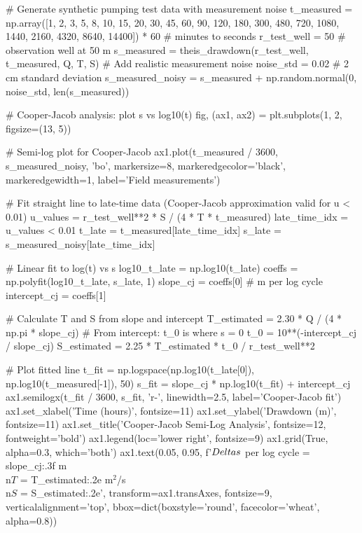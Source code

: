 \documentclass[a4paper, 11pt]{article}
\begin{document}
\begin{pycode}
# Generate synthetic pumping test data with measurement noise
t_measured = np.array([1, 2, 3, 5, 8, 10, 15, 20, 30, 45, 60, 90, 120, 180,
                       300, 480, 720, 1080, 1440, 2160, 4320, 8640, 14400]) * 60  # minutes to seconds
r_test_well = 50  # observation well at 50 m
s_measured = theis_drawdown(r_test_well, t_measured, Q, T, S)
# Add realistic measurement noise
noise_std = 0.02  # 2 cm standard deviation
s_measured_noisy = s_measured + np.random.normal(0, noise_std, len(s_measured))

# Cooper-Jacob analysis: plot s vs log10(t)
fig, (ax1, ax2) = plt.subplots(1, 2, figsize=(13, 5))

# Semi-log plot for Cooper-Jacob
ax1.plot(t_measured / 3600, s_measured_noisy, 'bo', markersize=8,
         markeredgecolor='black', markeredgewidth=1, label='Field measurements')

# Fit straight line to late-time data (Cooper-Jacob approximation valid for u < 0.01)
u_values = r_test_well**2 * S / (4 * T * t_measured)
late_time_idx = u_values < 0.01
t_late = t_measured[late_time_idx]
s_late = s_measured_noisy[late_time_idx]

# Linear fit to log(t) vs s
log10_t_late = np.log10(t_late)
coeffs = np.polyfit(log10_t_late, s_late, 1)
slope_cj = coeffs[0]  # m per log cycle
intercept_cj = coeffs[1]

# Calculate T and S from slope and intercept
T_estimated = 2.30 * Q / (4 * np.pi * slope_cj)
# From intercept: t_0 is where s = 0
t_0 = 10**(-intercept_cj / slope_cj)
S_estimated = 2.25 * T_estimated * t_0 / r_test_well**2

# Plot fitted line
t_fit = np.logspace(np.log10(t_late[0]), np.log10(t_measured[-1]), 50)
s_fit = slope_cj * np.log10(t_fit) + intercept_cj
ax1.semilogx(t_fit / 3600, s_fit, 'r-', linewidth=2.5, label='Cooper-Jacob fit')
ax1.set_xlabel('Time (hours)', fontsize=11)
ax1.set_ylabel('Drawdown (m)', fontsize=11)
ax1.set_title('Cooper-Jacob Semi-Log Analysis', fontsize=12, fontweight='bold')
ax1.legend(loc='lower right', fontsize=9)
ax1.grid(True, alpha=0.3, which='both')
ax1.text(0.05, 0.95, f'$\\Delta s$ per log cycle = {slope_cj:.3f} m\\n$T$ = {T_estimated:.2e} m$^2$/s\\n$S$ = {S_estimated:.2e}',
         transform=ax1.transAxes, fontsize=9, verticalalignment='top',
         bbox=dict(boxstyle='round', facecolor='wheat', alpha=0.8))


\end{pycode}
\end{document}
